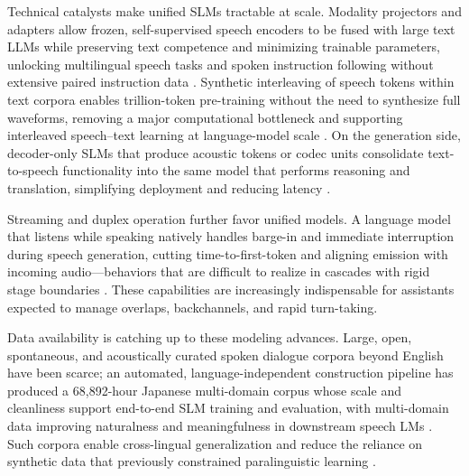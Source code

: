 \documentclass{article}
\begin{document}
Technical catalysts make unified SLMs tractable at scale. Modality projectors and adapters allow frozen, self-supervised speech encoders to be fused with large text LLMs while preserving text competence and minimizing trainable parameters, unlocking multilingual speech tasks and spoken instruction following without extensive paired instruction data \cite{wang2023slmbridgethingapbetweenspeechtextfoundat}. Synthetic interleaving of speech tokens within text corpora enables trillion-token pre-training without the need to synthesize full waveforms, removing a major computational bottleneck and supporting interleaved speech--text learning at language-model scale \cite{zeng2024scalingspeechtextpretrainingsyntheticint}. On the generation side, decoder-only SLMs that produce acoustic tokens or codec units consolidate text-to-speech functionality into the same model that performs reasoning and translation, simplifying deployment and reducing latency \cite{peng2024mslms2stmultitaskspeechlanguagemodeltext}.



Streaming and duplex operation further favor unified models. A language model that listens while speaking natively handles barge-in and immediate interruption during speech generation, cutting time-to-first-token and aligning emission with incoming audio---behaviors that are difficult to realize in cascades with rigid stage boundaries \cite{ma2024languagemodelcanlistenwhilespeaking}. These capabilities are increasingly indispensable for assistants expected to manage overlaps, backchannels, and rapid turn-taking.



Data availability is catching up to these modeling advances. Large, open, spontaneous, and acoustically curated spoken dialogue corpora beyond English have been scarce; an automated, language-independent construction pipeline has produced a 68,892-hour Japanese multi-domain corpus whose scale and cleanliness support end-to-end SLM training and evaluation, with multi-domain data improving naturalness and meaningfulness in downstream speech LMs \cite{nakata2024jchatjapaneselargescalespokendialoguecor}. Such corpora enable cross-lingual generalization and reduce the reliance on synthetic data that previously constrained paralinguistic learning \cite{wang2024blspemotowardsempatheticlargespeechlangu}.
\end{document}
